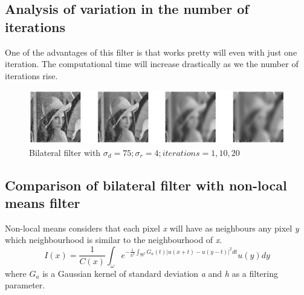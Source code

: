 \documentclass[a4paper, 10pt, conference] {article}
\begin{document}
\subsection{Analysis of variation in the number of iterations}
One of the advantages of this filter is that works pretty will even with just one iteration. The computational time will increase drastically as we the number of iterations rise.
\begin{figure}[H]
	\centering
	\includegraphics[width=1\textwidth]{iterations_analysis.JPG} %
	\caption{Bilateral filter with $\sigma_{d}=75; \sigma_{r}=4; iterations = 1, 10, 20$}
	\label{it}
\end{figure}


\subsection{Comparison of bilateral filter with non-local means filter}
Non-local means considers that each pixel \textit{x} will have as neighbours any pixel \textit{y} which neighbourhood is similar to the neighbourhood of \textit{x}.
\begin{equation}
I(x) = \frac{1}{C(x)}\int_{\omega}e^{-\frac{1}{h^2}\int_{\Re^{2}} G_{\textit{a}}(t)\lvert u(x+t) -u(y-t) \rvert^{2}dt} u(y)dy 
\end{equation}
where $G_{\textit{a}}$ is a Gaussian kernel of standard deviation \textit{a} and \textit{h} as a filtering parameter.
\end{document}
